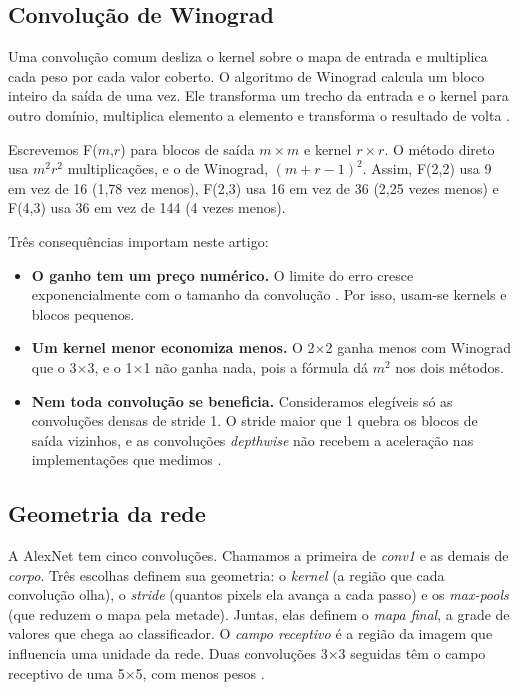 \documentclass[conference]{IEEEtran}
\newcommand{\by}{\ensuremath{\times}}
\begin{document}
\subsection{Convolução de Winograd}

Uma convolução comum desliza o kernel sobre o mapa de entrada e multiplica cada peso por cada valor coberto. O algoritmo de Winograd
calcula um bloco inteiro da saída de uma vez. Ele transforma um trecho da entrada e o kernel para outro domínio, multiplica elemento a
elemento e transforma o resultado de volta \cite{lavin2016fast}.

Escrevemos F($m$,$r$) para blocos de saída $m\times m$ e kernel $r\times r$. O método direto usa $m^2r^2$ multiplicações, e o de Winograd,
$(m+r-1)^2$. Assim, F(2,2) usa 9 em vez de 16 (1,78 vez menos), F(2,3) usa 16 em vez de 36 (2,25 vezes menos) e F(4,3) usa 36 em vez de 144
(4 vezes menos).

Três consequências importam neste artigo:
\begin{itemize}
\item \textbf{O ganho tem um preço numérico.} O limite do erro cresce exponencialmente com o tamanho da convolução \cite{barabasz2020error}. Por isso, usam-se kernels e blocos pequenos.
\item \textbf{Um kernel menor economiza menos.} O 2\by2 ganha menos com Winograd que o 3\by3, e o 1\by1 não ganha nada, pois a fórmula dá $m^2$ nos dois métodos.
\item \textbf{Nem toda convolução se beneficia.} Consideramos elegíveis só as convoluções densas de stride 1. O stride maior que 1 quebra os blocos de saída vizinhos, e as convoluções \textit{depthwise} não recebem a aceleração nas implementações que medimos \cite{souza2026relatorio}.
\end{itemize}

\subsection{Geometria da rede}

A AlexNet tem cinco convoluções. Chamamos a primeira de \textit{conv1} e as demais de \textit{corpo}. Três escolhas definem sua geometria: o
\textit{kernel} (a região que cada convolução olha), o \textit{stride} (quantos pixels ela avança a cada passo) e os \textit{max-pools} (que
reduzem o mapa pela metade). Juntas, elas definem o \textit{mapa final}, a grade de valores que chega ao classificador. O \textit{campo
receptivo} é a região da imagem que influencia uma unidade da rede. Duas convoluções 3\by3 seguidas têm o campo receptivo de uma 5\by5, com
menos pesos \cite{simonyan2015very}.
\end{document}
